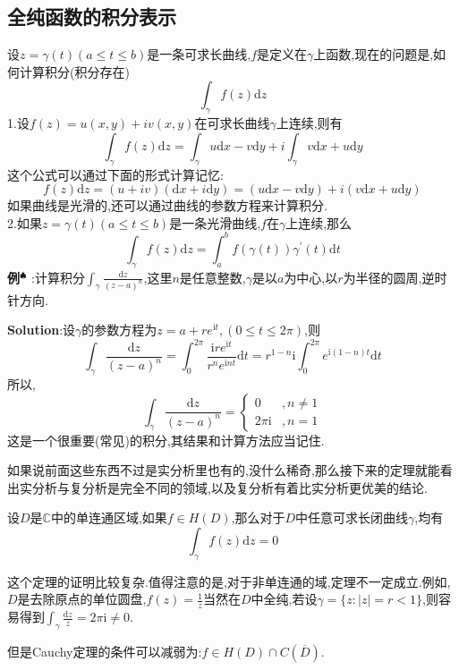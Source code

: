 \subsection{全纯函数的积分表示}
设$z=\gamma (t) (a\leqslant t\leqslant b)$是一条可求长曲线,$f$是定义在$\gamma$上函数,现在的问题是,如何计算积分(积分存在)
$$
\int_{\gamma}f(z)\mathrm{d}z
$$
1.设$f(z)=u(x,y)+iv(x,y)$在可求长曲线$\gamma$上连续,则有
$$
\int_{\gamma}f(z)\mathrm{d}z=\int_{\gamma}u\mathrm{d}x-v\mathrm{d}y+i\int_{\gamma}v\mathrm{d}x+u\mathrm{d}y
$$
这个公式可以通过下面的形式计算记忆:
$$
f(z)\mathrm{d}z=(u+iv)(\mathrm{d}x+i\mathrm{d}y)=(u\mathrm{d}x-v\mathrm{d}y)+i(v\mathrm{d}x+u\mathrm{d}y)
$$
如果曲线是光滑的,还可以通过曲线的参数方程来计算积分.\\
2.如果$z=\gamma (t) (a\leqslant t\leqslant b)$是一条光滑曲线,$f$在$\gamma$上连续,那么
$$
\int_{\gamma}f(z)\mathrm{d}z=\int^b_a f(\gamma(t))\gamma^{\prime}(t)\mathrm{d}t
$$
\quad \quad \textbf{例}$^\spadesuit$ :计算积分$\int_{\gamma}\frac{\mathrm{d}z}{(z-a)^n}$,这里$n$是任意整数,$\gamma$是以$a$为中心,以$r$为半径的圆周,逆时针方向.\par
\textbf{Solution}:设$\gamma$的参数方程为$z=a+re^{\mathrm{i}t},(0\leqslant t\leqslant 2\pi)$,则
$$
\int_{\gamma}\frac{\mathrm{d}z}{(z-a)^n}=\int^{2\pi}_0\frac{\mathrm{i}re^{\mathrm{i}t}}{r^ne^{\mathrm{i}nt}}\mathrm{d}t=r^{1-n}\mathrm{i}\int^{2\pi}_0e^{\mathrm{i}(1-n)t}\mathrm{d}t
$$
所以,
$$
\int_{\gamma}\frac{\mathrm{d}z}{(z-a)^n}=
\begin{cases}
    0 &,n\neq 1\\
    2\pi\mathrm{i} &, n=1
\end{cases}
$$
这是一个很重要(常见)的积分,其结果和计算方法应当记住.\par
如果说前面这些东西不过是实分析里也有的,没什么稀奇,那么接下来的定理就能看出实分析与复分析是完全不同的领域,以及复分析有着比实分析更优美的结论.
\begin{tcolorbox}[colback=KuangNei,colframe=BianKuang,title=\textbf{Cauchy积分定理},sharpish corners]
    设$D$是$\mathbb{C}$中的单连通区域,如果$f\in H(D)$,那么对于$D$中任意可求长闭曲线$\gamma$,均有
    $$
    \int_{\gamma}f(z)\mathrm{d}z=0
    $$
\end{tcolorbox}
这个定理的证明比较复杂.值得注意的是,对于非单连通的域,定理不一定成立.例如,$D$是去除原点的单位圆盘,$f(z)=\frac{1}{z}$当然在$D$中全纯,若设$\gamma=\{z:|z|=r<1\}$,则容易得到$\int_{\gamma}\frac{\mathrm{d}z}{z}=2\pi \mathrm{i}\neq 0$.\par
但是Cauchy定理的条件可以减弱为:$f\in H(D)\cap C(\overline{D})$.\par
